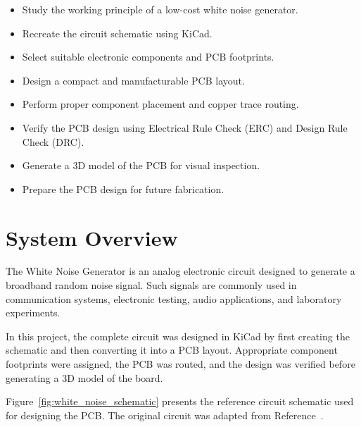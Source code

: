 \begin{itemize}

\item Study the working principle of a low-cost white noise generator.

\item Recreate the circuit schematic using KiCad.

\item Select suitable electronic components and PCB footprints.

\item Design a compact and manufacturable PCB layout.

\item Perform proper component placement and copper trace routing.

\item Verify the PCB design using Electrical Rule Check (ERC) and Design Rule Check (DRC).

\item Generate a 3D model of the PCB for visual inspection.

\item Prepare the PCB design for future fabrication.

\end{itemize}


\section{System Overview}

The White Noise Generator is an analog electronic circuit designed to generate a broadband random noise signal. Such signals are commonly used in communication systems, electronic testing, audio applications, and laboratory experiments.

In this project, the complete circuit was designed in KiCad by first creating the schematic and then converting it into a PCB layout. Appropriate component footprints were assigned, the PCB was routed, and the design was verified before generating a 3D model of the board.


Figure~\ref{fig:white_noise_schematic} presents the reference circuit schematic used for designing the PCB. The original circuit was adapted from Reference~\cite{white_noise_appnote}.

